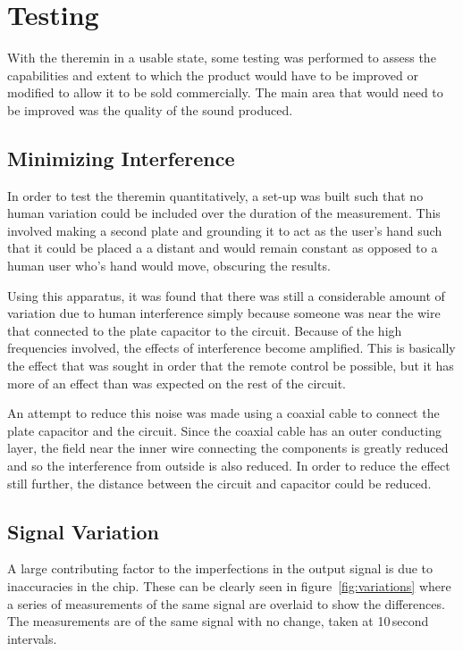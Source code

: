 \section{Testing}
With the theremin in a usable state, some testing was performed to assess the capabilities and extent to which the product would have to be improved or modified to allow it to be sold commercially. The main area that would need to be improved was the quality of the sound produced.

\subsection{Minimizing Interference}
In order to test the theremin quantitatively, a set-up was built such that no human variation could be included over the duration of the measurement. This involved making a second plate and grounding it to act as the user's hand such that it could be placed a a distant and would remain constant as opposed to a human user who's hand would move, obscuring the results. 

Using this apparatus, it was found that there was still a considerable amount of variation due to human interference simply because someone was near the wire that connected to the plate capacitor to the circuit. Because of the high frequencies involved, the effects of interference become amplified. This is basically the effect that was sought in order that the remote control be possible, but it has more of an effect than was expected on the rest of the circuit.

An attempt to reduce this noise was made using a coaxial cable to connect the plate capacitor and the circuit. Since the coaxial cable has an outer conducting layer, the field near the inner wire connecting the components is greatly reduced and so the interference from outside is also reduced. In order to reduce the effect still further, the distance between the circuit and capacitor could be reduced.

\subsection{Signal Variation}
A large contributing factor to the imperfections in the output signal is due to inaccuracies in the chip. These can be clearly seen in figure~\ref{fig:variations} where a series of measurements of the same signal are overlaid to show the differences. The measurements are of the same signal with no change, taken at 10\,second intervals.


